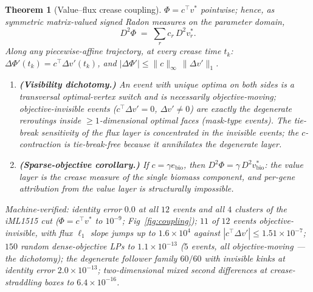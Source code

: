 \documentclass[11pt,a4paper]{article}
\theoremstyle{plain}
\newtheorem{theorem}{Theorem}[section]
\theoremstyle{definition}
\theoremstyle{remark}
\begin{document}
\begin{theorem}[Value--flux crease coupling]\label{thm:coupling}
$\Phi = c^\top v^*$ pointwise; hence, as symmetric matrix-valued
signed Radon measures on the parameter domain,
\[
D^2\Phi \;=\; \sum_{r} c_r\, D^2 v^*_r .
\]
Along any piecewise-affine trajectory, at every crease time $t_k$:
$\Delta\Phi'(t_k) = c^\top \Delta v'(t_k)$, and
$|\Delta\Phi'| \le \|c\|_\infty \,\|\Delta v'\|_1$.
\begin{enumerate}[label=(\roman*),leftmargin=2em]
\item \textbf{(Visibility dichotomy.)} An event with unique optima
      on both sides is a transversal optimal-vertex switch and is
      necessarily objective-moving; objective-invisible events
      ($c^\top \Delta v' = 0$, $\Delta v' \neq 0$) are exactly the
      degenerate reroutings inside $\ge 1$-dimensional optimal faces
      (mask-type events). The tie-break sensitivity of the flux layer
      is concentrated in the invisible events; the $c$-contraction is
      tie-break-free because it annihilates the degenerate layer.
\item \textbf{(Sparse-objective corollary.)} If $c =
      \gamma e_{\mathrm{bio}}$, then $D^2\Phi = \gamma\, D^2
      v^*_{\mathrm{bio}}$: the value layer is the crease measure of
      the single biomass component, and per-gene attribution from the
      value layer is structurally impossible.
\end{enumerate}
Machine-verified: identity error $0.0$ at all $12$ events and all
$4$ clusters of the iML1515 cut ($\Phi = c^\top v^*$ to $10^{-9}$;
Fig~\ref{fig:coupling});
$11$ of $12$ events objective-invisible, with flux $\ell_1$ slope
jumps up to $1.6 \times 10^{4}$ against $|c^\top \Delta v'| \le
1.51 \times 10^{-7}$; $150$ random dense-objective LPs to $1.1 \times
10^{-13}$ ($5$ events, all objective-moving --- the dichotomy); the
degenerate follower family $60/60$ with invisible kinks at identity
error $2.0 \times 10^{-13}$; two-dimensional mixed second
differences at crease-straddling boxes to $6.4 \times 10^{-16}$.
\end{theorem}
\end{document}
